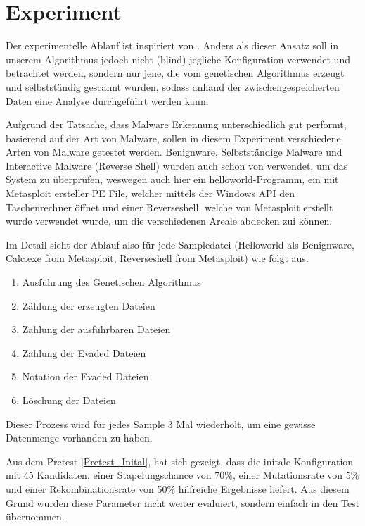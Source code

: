\section{Experiment}
\label{Sec:Experiment}
Der experimentelle Ablauf ist inspiriert von \cite{holm_2023_hide}. 
Anders als dieser Ansatz soll in unserem Algorithmus jedoch nicht (blind) jegliche Konfiguration verwendet und betrachtet werden, sondern nur jene, die vom genetischen Algorithmus erzeugt und selbstständig gescannt wurden, sodass anhand der zwischengespeicherten Daten eine Analyse durchgeführt werden kann.

Aufgrund der Tatsache, dass Malware Erkennung unterschiedlich gut performt, basierend auf der Art von Malware, sollen in diesem Experiment verschiedene Arten von Malware getestet werden. Benignware, Selbstständige Malware und Interactive Malware (Reverse Shell) wurden auch schon von \cite{holm_2023_hide} verwendet, um das System zu überprüfen, weswegen auch hier ein helloworld-Programm, ein mit Metasploit ersteller PE File, welcher mittels der Windows API den Taschenrechner öffnet und einer Reverseshell, welche von Metasploit erstellt wurde verwendet wurde, um die verschiedenen Areale abdecken zui können.

Im Detail sieht der Ablauf also für jede Sampledatei (Helloworld als Benignware, Calc.exe from Metasploit, Reverseshell from Metasploit) wie folgt aus.
\begin{enumerate}
    \item Ausführung des Genetischen Algorithmus
    \item Zählung der erzeugten Dateien
    \item Zählung der ausführbaren Dateien
    \item Zählung der Evaded Dateien
    \item Notation der Evaded Dateien
    \item Löschung der Dateien
\end{enumerate}
Dieser Prozess wird für jedes Sample 3 Mal wiederholt, um eine gewisse Datenmenge vorhanden zu haben.

Aus dem Pretest \ref{Pretest_Inital}, hat sich gezeigt, dass die initale Konfiguration mit 45 Kandidaten, einer Stapelungschance von 70\%, einer Mutationsrate von 5\% und einer Rekombinationsrate von 50\% hilfreiche Ergebnisse liefert. Aus diesem Grund wurden diese Parameter nicht weiter evaluiert, sondern einfach in den Test übernommen.
